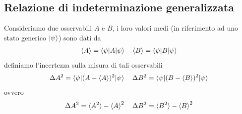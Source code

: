 \documentclass{article}
\begin{document}
\subsection{Relazione di indeterminazione generalizzata}
Consideriamo due osservabili $A$ e $B$, i loro valori medi (in riferimento ad uno stato generico $\ket{\psi}$) sono dati da
\begin{gather}
    \braket{A} = \braket{\psi|A|\psi} \quad \braket{B} = \braket{\psi|B|\psi} \notag
\end{gather}
definiamo l'incertezza sulla misura di tali osservabili
\begin{gather}
    \Delta A^2 = \braket{\psi|(A - \braket{A})^2|\psi} \quad \Delta B^2 = \braket{\psi|(B - \braket{B})^2|\psi} \notag
\end{gather}
ovvero
\begin{gather}
    \Delta A^2 = \braket{A^2} - \braket{A}^2 \quad \Delta B^2 = \braket{B^2} - \braket{B}^2 \notag
\end{gather}

\newpage
\end{document}
